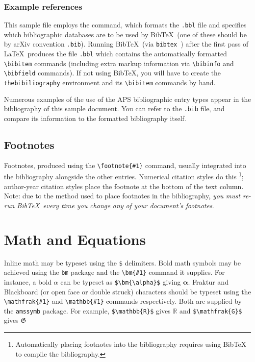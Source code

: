 \documentclass[%
 preprint, linenumbers,
 amsmath,amssymb,
 aps, physrev,
pra,
]{revtex4-2}
\begin{document}
\subsubsection{Example references}
This sample file employs the \verb++ command, 
which formats the \texttt{\jobname .bbl} file
and specifies which bibliographic databases are to be used by Bib\TeX\ 
(one of these should be by arXiv convention \texttt{\jobname .bib}).
Running Bib\TeX\ (via \texttt{bibtex \jobname}) 
after the first pass of \LaTeX\ produces the file
\texttt{\jobname .bbl} which contains the automatically formatted
\verb+\bibitem+ commands (including extra markup information via
\verb+\bibinfo+ and \verb+\bibfield+ commands). 
If not using Bib\TeX, you will have to create the \verb+thebibiliography+ environment 
and its \verb+\bibitem+ commands by hand.

Numerous examples of the use of the APS bibliographic entry types appear in the bibliography of this sample document.
You can refer to the \texttt{\jobname .bib} file, 
and compare its information to the formatted bibliography itself.

\subsection{Footnotes}%
Footnotes, produced using the \verb+\footnote{#1}+ command, 
usually integrated into the bibliography alongside the other entries.
Numerical citation styles do this%
\footnote{Automatically placing footnotes into the bibliography requires using BibTeX to compile the bibliography.};
author-year citation styles place the footnote at the bottom of the text column.
Note: due to the method used to place footnotes in the bibliography, 
\emph{you must re-run Bib\TeX\ every time you change any of your document's footnotes}. 

\section{Math and Equations}
Inline math may be typeset using the \verb+$+ delimiters. Bold math
symbols may be achieved using the \verb+bm+ package and the
\verb+\bm{#1}+ command it supplies. For instance, a bold $\alpha$ can
be typeset as \verb+$\bm{\alpha}$+ giving $\bm{\alpha}$. Fraktur and
Blackboard (or open face or double struck) characters should be
typeset using the \verb+\mathfrak{#1}+ and \verb+\mathbb{#1}+ commands
respectively. Both are supplied by the \texttt{amssymb} package. For
example, \verb+$\mathbb{R}$+ gives $\mathbb{R}$ and
\verb+$\mathfrak{G}$+ gives $\mathfrak{G}$
\end{document}
